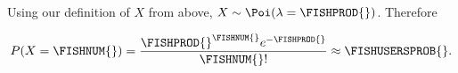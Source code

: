 Using our definition of $X$ from above, $X\sim\Poi(\lambda = \FISHPROD{})$. Therefore

\[P(X = \FISHNUM{}) = \dfrac{\FISHPROD{}^{\FISHNUM{}} e^{-\FISHPROD{}}}{\FISHNUM{}!} \approx \FISHUSERSPROB{}.\]